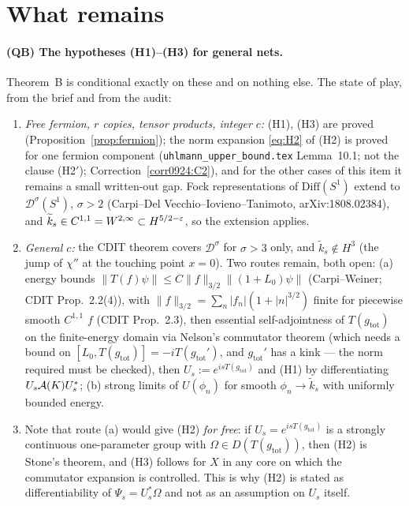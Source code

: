 \documentclass[11pt]{article}
\newcommand{\Om}{\Omega}
\newcommand{\norm}[1]{\lVert#1\rVert}
\newcommand{\kt}{\widetilde k}
\newcommand{\gtot}{g_{\mathrm{tot}}}
\begin{document}
\section{What remains}\label{sec:remains}

\paragraph{(QB) The hypotheses (H1)--(H3) for general nets.}
Theorem~B is conditional exactly on these and on nothing else.  The state of play, from the brief and from
the audit:
\begin{enumerate}[leftmargin=1.7em]
\item \emph{Free fermion, $r$ copies, tensor products, integer $c$:} (H1), (H3) are proved
 (Proposition~\ref{prop:fermion}); the norm expansion \eqref{eq:H2} of (H2) is proved for one fermion component (\texttt{uhlmann\_upper\_bound.tex} Lemma~10.1; not the clause (H2$'$); Correction~\ref{corr0924:C2}), and for the other cases of this item it remains a small written-out gap.  Fock representations of
 $\mathrm{Diff}(S^1)$ extend to $\mathcal D^\sigma(S^1)$, $\sigma>2$ (Carpi--Del Vecchio--Iovieno--Tanimoto,
 arXiv:1808.02384), and $\kt_s\in C^{1,1}=W^{2,\infty}\subset H^{5/2-\eps}$, so the extension applies.
\item \emph{General $c$:} the CDIT theorem covers $\mathcal D^\sigma$ for $\sigma>3$ only, and $\kt_s\notin
 H^3$ (the jump of $\chi''$ at the touching point $x=0$).  Two routes remain, both open:
 (a) energy bounds $\norm{T(f)\psi}\le C\norm f_{3/2}\norm{(1+L_0)\psi}$ (Carpi--Weiner; CDIT Prop.~2.2(4)),
 with $\norm f_{3/2}=\sum_n|f_n|(1+|n|^{3/2})$ finite for piecewise smooth $C^{1,1}$ $f$ (CDIT Prop.~2.3),
 then essential self-adjointness of $T(\gtot)$ on the finite-energy domain via Nelson's commutator theorem
 (which needs a bound on $[L_0,T(\gtot)]=-iT(\gtot')$, and $\gtot'$ has a kink --- the norm required must be
 checked), then $U_s:=e^{isT(\gtot)}$ and (H1) by differentiating $U_s\mathcal A(K)U_s^*$;
 (b) strong limits of $U(\phi_n)$ for smooth $\phi_n\to\kt_s$ with uniformly bounded energy.
\item Note that route (a) would give (H2) \emph{for free}: if $U_s=e^{isT(\gtot)}$ is a strongly continuous
 one-parameter group with $\Om\in D(T(\gtot))$, then (H2) is Stone's theorem, and (H3) follows for
 $X$ in any core on which the commutator expansion is controlled.  This is why (H2) is stated as
 differentiability of $\Psi_s=U_s^*\Om$ and not as an assumption on $U_s$ itself.
\end{enumerate}
\end{document}
